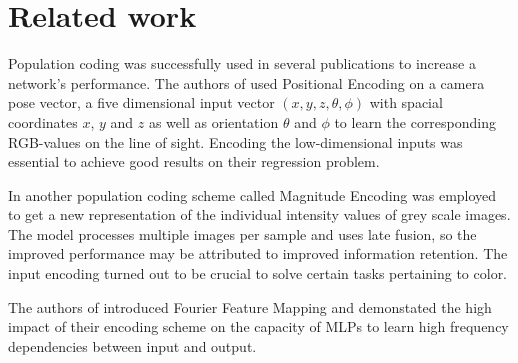 \section{Related work}
Population coding was successfully used in several publications to increase a network's performance. 
The authors of \cite{mildenhall2020nerf} used Positional Encoding on a camera pose vector, a five dimensional input vector $(x,y,z,\theta, \phi)$ with spacial coordinates $x$, $y$ and $z$ as well as orientation $\theta$ and $\phi$ to learn the corresponding RGB-values on the line of sight.
Encoding the low-dimensional inputs was essential to achieve good results on their regression problem. 

In \cite{jahrens2020solving} another population coding scheme called Magnitude Encoding was employed to get a new representation of the individual intensity values of grey scale images. 
The model processes multiple images per sample and uses late fusion, so the improved performance may be attributed to improved information retention.
The input encoding turned out to be crucial to solve certain tasks pertaining to color. 

The authors of \cite{tancik2020fourier} introduced Fourier Feature Mapping and demonstated the high impact of their encoding scheme on the capacity of MLPs to learn high frequency dependencies between input and output. 

